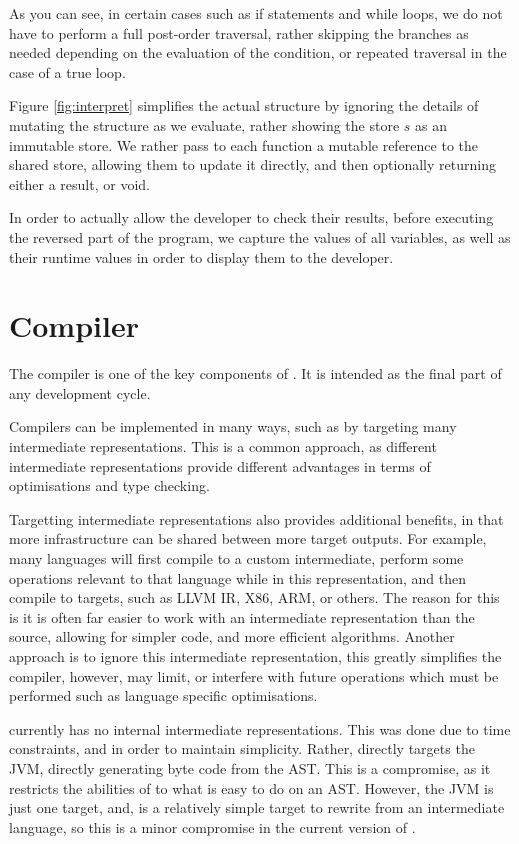 As you can see, in certain cases such as if statements and while loops, we do not have to perform a full post-order traversal, rather skipping the branches as needed depending on the evaluation of the condition, or repeated traversal in the case of a true loop.

Figure \ref{fig:interpret} simplifies the actual structure by ignoring the details of mutating the structure as we evaluate, rather showing the store $s$ as an immutable store. We rather pass to each function a mutable reference to the shared store, allowing them to update it directly, and then optionally returning either a result, or void.

In order to actually allow the developer to check their results, before executing the reversed part of the program, we capture the values of all variables, as well as their runtime values in order to display them to the developer.

\section{Compiler}

The compiler is one of the key components of \rimp. It is intended as the final part of any development cycle. 

Compilers can be implemented in many ways, such as by targeting many intermediate representations. This is a common approach, as different intermediate representations provide different advantages in terms of optimisations and type checking.

Targetting intermediate representations also provides additional benefits, in that more infrastructure can be shared between more target outputs. For example, many languages will first compile to a custom intermediate, perform some operations relevant to that language while in this representation, and then compile to targets, such as LLVM IR, X86, ARM, or others. The reason for this is it is often far easier to work with an intermediate representation than the source, allowing for simpler code, and more efficient algorithms.
Another approach is to ignore this intermediate representation, this greatly simplifies the compiler, however, may limit, or interfere with future operations which must be performed such as language specific optimisations.

\rimp currently has no internal intermediate representations. This was done due to time constraints, and in order to maintain simplicity. Rather, \rimp directly targets the JVM, directly generating byte code from the AST. This is a compromise, as it restricts the abilities of \rimp to what is easy to do on an AST. However, the JVM is just one target, and, is a relatively simple target to rewrite from an intermediate language, so this is a minor compromise in the current version of \rimp.

